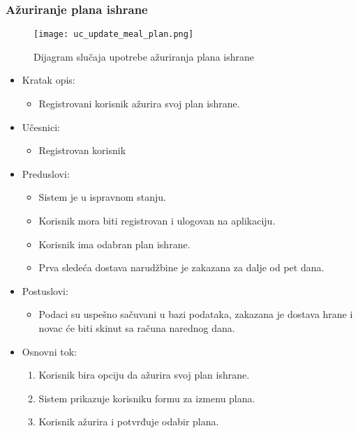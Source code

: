 \subsubsection{Ažuriranje plana ishrane}

\begin{figure}[H]
\begin{center}
\texttt{[image: uc\_update\_meal\_plan.png]}
\end{center}
    \caption{Dijagram slučaja upotrebe ažuriranja plana ishrane}
\label{fig:UCUpdateMealPlan}
\end{figure}

\begin{itemize}
    \item Kratak opis:
        \begin{itemize}
            \item Registrovani korisnik ažurira svoj plan ishrane.
        \end{itemize}
    \item Učesnici:
        \begin{itemize}
            \item Registrovan korisnik
        \end{itemize}
    \item Preduslovi:
        \begin{itemize}
            \item Sistem je u ispravnom stanju.
            \item Korisnik mora biti registrovan i ulogovan na aplikaciju.
            \item Korisnik ima odabran plan ishrane.
            \item Prva sledeća dostava narudžbine je zakazana za dalje od pet dana.
        \end{itemize}
    \item Postuslovi:
        \begin{itemize}
            \item Podaci su uspešno sačuvani u bazi podataka, zakazana je dostava hrane i novac će biti skinut sa računa narednog dana.
        \end{itemize}
    \item Osnovni tok:
        \begin{enumerate}
            \item Korisnik bira opciju da ažurira svoj plan ishrane.
            \item Sistem prikazuje korisniku formu za izmenu plana.
            \item Korisnik ažurira i potvrđuje odabir plana.

\end{enumerate}
\end{itemize}
